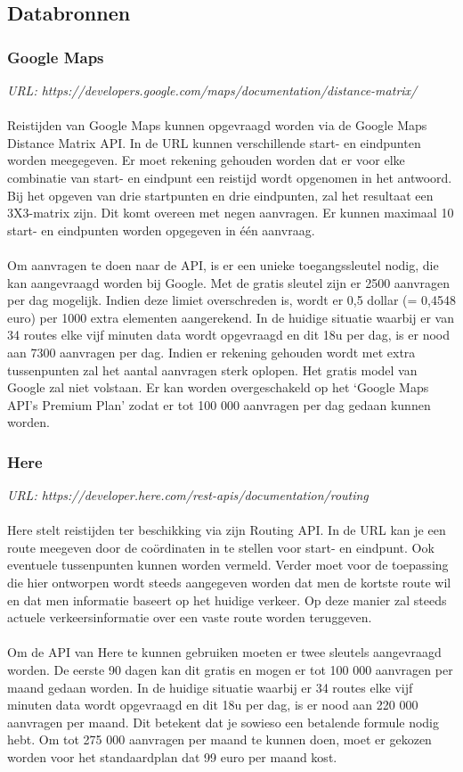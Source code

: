 \documentclass[ps,a4paper,oneside]{report}
\begin{document}
\subsection{Databronnen}
\subsubsection{Google Maps}
\textit{URL: https://developers.google.com/maps/documentation/distance-matrix/}\\\\
Reistijden van Google Maps kunnen opgevraagd worden via de Google Maps Distance Matrix API. In de URL kunnen verschillende start- en eindpunten worden meegegeven. Er moet rekening gehouden worden dat er voor elke combinatie van start- en eindpunt een reistijd wordt opgenomen in het antwoord. Bij het opgeven van drie startpunten en drie eindpunten, zal het resultaat een 3X3-matrix zijn. Dit komt overeen met negen aanvragen. Er kunnen maximaal 10 start- en eindpunten worden opgegeven in \'e\'en aanvraag.\\\\
Om aanvragen te doen naar de API, is er een unieke toegangssleutel nodig, die kan aangevraagd worden bij Google. Met de gratis sleutel zijn er 2500 aanvragen per dag mogelijk. Indien deze limiet overschreden is, wordt er 0,5 dollar (= 0,4548 euro)  per 1000 extra elementen aangerekend. In de huidige situatie waarbij er van 34 routes elke vijf minuten data wordt opgevraagd en dit 18u per dag, is er nood aan 7300 aanvragen per dag. Indien er rekening gehouden wordt met extra tussenpunten zal het aantal aanvragen sterk oplopen. Het gratis model van Google zal niet volstaan. Er kan worden overgeschakeld op het ‘Google Maps API's Premium Plan’ zodat er tot 100 000 aanvragen per dag gedaan kunnen worden.

\subsubsection{Here}
\textit{URL: https://developer.here.com/rest-apis/documentation/routing}\\\\
Here stelt reistijden ter beschikking via zijn Routing API. In de URL kan je een route meegeven door de coördinaten in te stellen voor start- en eindpunt. Ook eventuele tussenpunten kunnen worden vermeld. Verder moet voor de toepassing die hier ontworpen wordt steeds aangegeven worden dat men de kortste route wil en dat men informatie baseert op het huidige verkeer. Op deze manier zal steeds actuele verkeersinformatie over een vaste route worden teruggeven.\\\\
Om de API van Here te kunnen gebruiken moeten er twee sleutels aangevraagd worden. De eerste 90 dagen kan dit gratis en mogen er tot 100 000 aanvragen per maand gedaan worden. In de huidige situatie waarbij er 34 routes elke vijf minuten data wordt opgevraagd en dit 18u per dag, is er nood aan 220 000 aanvragen per maand. Dit betekent dat je sowieso een betalende formule nodig hebt. Om tot 275 000 aanvragen per maand te kunnen doen, moet er gekozen worden voor het standaardplan dat 99 euro per maand kost.
\clearpage
\end{document}
